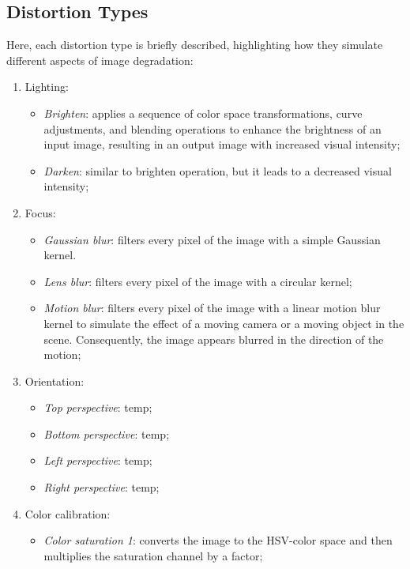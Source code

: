 \subsection{Distortion Types}
\label{sub:DistTypes}
Here, each distortion type is briefly described, highlighting how they simulate different aspects of image degradation: \par
\begin{enumerate}
    \item Lighting:
        \begin{itemize}
            \item \textit{Brighten}: applies a sequence of color space transformations, curve adjustments, and blending operations to enhance the brightness of an input image, resulting in an output image with increased visual intensity;
            \item \textit{Darken}: similar to brighten operation, but it leads to a decreased visual intensity;
        \end{itemize}
    \item Focus:
        \begin{itemize}
            \item \textit{Gaussian blur}: filters every pixel of the image with a simple Gaussian kernel.
            \item \textit{Lens blur}: filters every pixel of the image with a circular kernel;
            \item \textit{Motion blur}: filters every pixel of the image with a linear motion blur kernel to simulate the effect of a moving camera or a moving object in the scene. Consequently, the image appears blurred in the direction of the motion;
        \end{itemize}
    \item Orientation:
        \begin{itemize}
            \item \textit{Top perspective}: temp;
            \item \textit{Bottom perspective}: temp;
            \item \textit{Left perspective}: temp;
            \item \textit{Right perspective}: temp;
        \end{itemize}
    \item Color calibration:
        \begin{itemize}
            \item \textit{Color saturation 1}: converts the image to the HSV-color space and then multiplies the saturation channel by a factor;

\end{itemize}
\end{enumerate}
